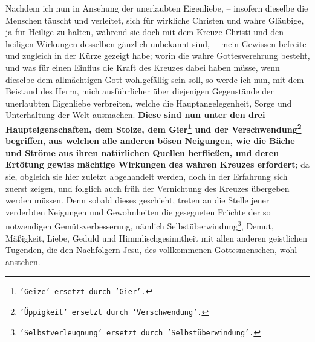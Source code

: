 Nachdem ich nun in Ansehung der unerlaubten Eigenliebe, -- insofern dieselbe die
Menschen täuscht und verleitet, sich für wirkliche Christen und wahre Gläubige,
ja für Heilige zu halten, während sie doch mit dem Kreuze Christi und den
heiligen Wirkungen desselben gänzlich unbekannt sind,~-- mein Gewissen befreite
und zugleich in der Kürze gezeigt habe;
worin die wahre Gottesverehrung
besteht, und was für einen Einflus die Kraft des Kreuzes dabei haben müsse,
wenn dieselbe dem allmächtigen Gott wohlgefällig sein soll, so werde ich nun,
mit dem Beistand des Herrn, mich ausführlicher über diejenigen Gegenstände der
unerlaubten Eigenliebe verbreiten, welche die
Hauptangelegenheit, Sorge und
Unterhaltung der Welt ausmachen.\label{ref:07_01_drei_haupteigenschaften}
\textbf{Diese sind nun unter den drei
Haupteigenschaften, dem Stolze, dem Gier\footnote{\texttt{'Geize'
ersetzt durch 'Gier'.}} und der
Verschwendung\footnote{\texttt{'Üppigkeit' ersetzt durch 'Verschwendung'.}}
 begriffen, aus
welchen alle anderen bösen Neigungen, wie die Bäche und Ströme aus ihren
natürlichen Quellen herfließen, und deren Ertötung gewiss mächtige Wirkungen
des wahren Kreuzes erfordert}; da sie, obgleich sie hier zuletzt abgehandelt
werden, doch in der Erfahrung sich zuerst zeigen, und folglich auch früh der
Vernichtung des Kreuzes übergeben werden müssen. Denn sobald dieses geschieht,
treten an die Stelle jener verderbten Neigungen und Gewohnheiten die gesegneten
Früchte der so notwendigen Gemütsverbesserung, nämlich
Selbstüberwindung\footnote{\texttt{'Selbstverleugnung' ersetzt durch
'Selbstüberwindung'.}},
Demut, Mäßigkeit, Liebe,
Geduld und Himmlischgesinntheit mit allen anderen
geistlichen Tugenden, die den Nachfolgern Jesu, des vollkommenen
Gottesmenschen,
wohl anstehen.

\medskip

